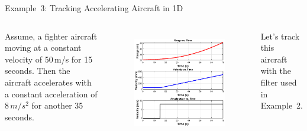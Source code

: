\begin{frame}{Example~3: Tracking Accelerating Aircraft in 1D}
\begin{columns}
    Assume, a fighter aircraft moving at a constant velocity of 50\,m/s for 15 seconds. Then the aircraft accelerates with a constant acceleration of $8\,m/s^2$ for another 35 seconds.
        \begin{figure}
	    \centering
	    \includegraphics[width=1\textwidth]{Figures/Chapter1/ex3_preliminary2.eps}
	    \label{fig:ex3_preliminary2}
	    \vspace{-20pt}
	\end{figure}
	
Let's track this aircraft with the filter used in Example~2.
\end{columns}    
\end{frame}
